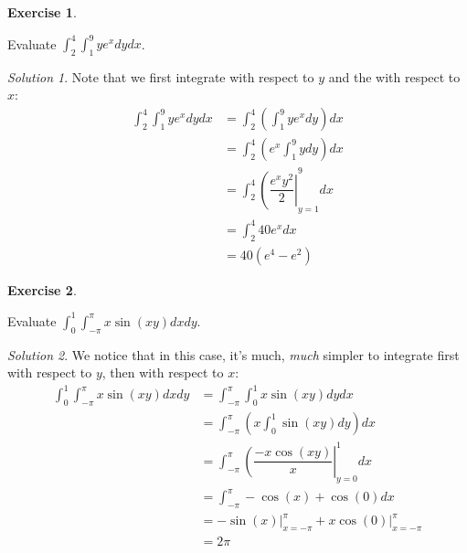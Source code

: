 \documentclass[
]{book}
\theoremstyle{definition}
\theoremstyle{definition}
\theoremstyle{definition}
\newtheorem{exercise}{Exercise}[chapter]
\theoremstyle{definition}
\theoremstyle{remark}
\newtheorem*{solution}{Solution}
\begin{document}
\begin{exercise}
\protect\hypertarget{exr:unlabeled-div-77}{}\label{exr:unlabeled-div-77}

Evaluate \(\displaystyle \int_2^4 \int_1^9 ye^x dy dx\).

\end{exercise}

\begin{solution}

Note that we first integrate with respect to \(y\) and the with respect to \(x\):
\begin{align*}
\displaystyle \int_2^4 \int_1^9 ye^x dy dx & = \int_2^4 \left ( \int_1^9 ye^x dy \right )dx\\
&= \int_2^4 \left (e^x\int_1^9 y dy\right ) dx\\
&= \int_2^4 \left ( \dfrac{e^xy^2}{2}\right |_{y=1}^9 dx\\
&= \int_2^4 40e^x dx\\
&= 40(e^4-e^2)
\end{align*}

\end{solution}

\begin{exercise}
\protect\hypertarget{exr:unlabeled-div-79}{}\label{exr:unlabeled-div-79}

Evaluate \(\displaystyle \int_0^{1}\int_{-\pi}^{\pi}x\sin(xy)dx dy\).

\end{exercise}

\begin{solution}

We notice that in this case, it's much, \emph{much} simpler to integrate first with respect to \(y\), then with respect to \(x\):
\begin{align*}
\displaystyle \int_0^1\int_{-\pi}^{\pi}x\sin(xy)dx dy & = \displaystyle \int_{-\pi}^{\pi}\int_{0}^1x\sin(xy)dy dx\\
& = \displaystyle \int_{-\pi}^{\pi} \left (x \int_0^1 \sin(xy)dy \right)dx \\
& = \displaystyle \int_{-\pi}^{\pi}  \left  (\dfrac{-x\cos(xy)}{x} \right|_{y=0}^1 dx \\
& = \displaystyle \int_{-\pi}^{\pi} -\cos(x)+\cos(0) dx \\
&= \left . -\sin(x) \right |_{x=-\pi}^{\pi}+ \left. x\cos(0) \right|_{x=-\pi}^{\pi}\\
&= 2\pi
\end{align*}

\end{solution}
\end{document}
